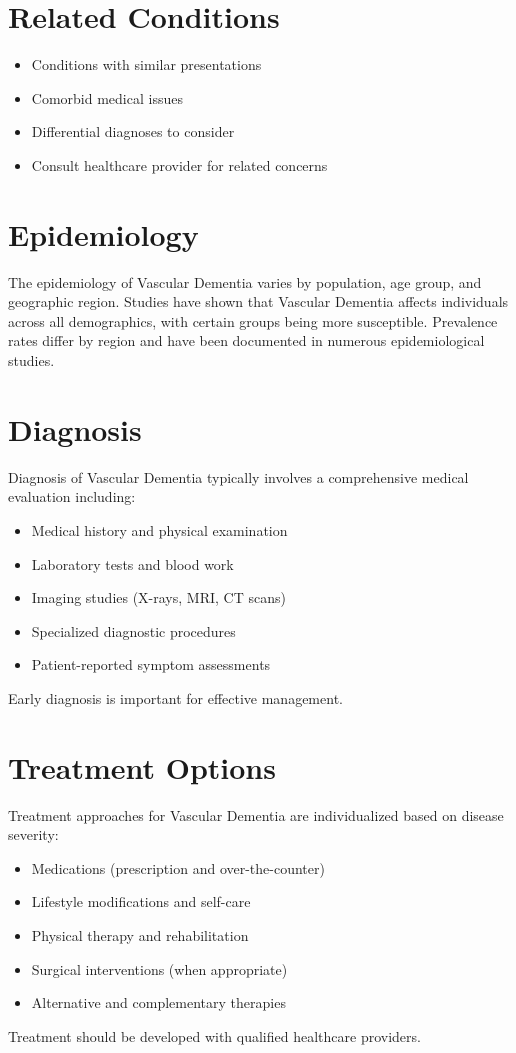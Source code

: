 \section*{Related Conditions}
\begin{itemize}
  \item Conditions with similar presentations
  \item Comorbid medical issues
  \item Differential diagnoses to consider
  \item Consult healthcare provider for related concerns
\end{itemize}

\section*{Epidemiology}
The epidemiology of Vascular Dementia varies by population, age group, and geographic region. Studies have shown that Vascular Dementia affects individuals across all demographics, with certain groups being more susceptible. Prevalence rates differ by region and have been documented in numerous epidemiological studies.

\section*{Diagnosis}
Diagnosis of Vascular Dementia typically involves a comprehensive medical evaluation including:
\begin{itemize}
  \item Medical history and physical examination
  \item Laboratory tests and blood work
  \item Imaging studies (X-rays, MRI, CT scans)
  \item Specialized diagnostic procedures
  \item Patient-reported symptom assessments
\end{itemize}
Early diagnosis is important for effective management.

\section*{Treatment Options}
Treatment approaches for Vascular Dementia are individualized based on disease severity:
\begin{itemize}
  \item Medications (prescription and over-the-counter)
  \item Lifestyle modifications and self-care
  \item Physical therapy and rehabilitation
  \item Surgical interventions (when appropriate)
  \item Alternative and complementary therapies
\end{itemize}
Treatment should be developed with qualified healthcare providers.

